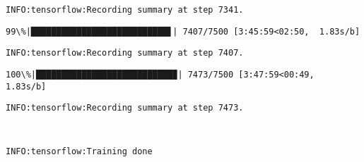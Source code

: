 \documentclass[11pt]{article}
\begin{document}
    \begin{Verbatim}[commandchars=\\\{\}]
INFO:tensorflow:Recording summary at step 7341.

    \end{Verbatim}

    \begin{Verbatim}[commandchars=\\\{\}]
 99\%|███████████████████████████▋| 7407/7500 [3:45:59<02:50,  1.83s/b]
    \end{Verbatim}

    \begin{Verbatim}[commandchars=\\\{\}]
INFO:tensorflow:Recording summary at step 7407.

    \end{Verbatim}

    \begin{Verbatim}[commandchars=\\\{\}]
100\%|███████████████████████████▉| 7473/7500 [3:47:59<00:49,  1.83s/b]
    \end{Verbatim}

    \begin{Verbatim}[commandchars=\\\{\}]
INFO:tensorflow:Recording summary at step 7473.

    \end{Verbatim}

    \begin{Verbatim}[commandchars=\\\{\}]
                                                                      
    \end{Verbatim}

    \begin{Verbatim}[commandchars=\\\{\}]
INFO:tensorflow:Training done

    \end{Verbatim}


    
    
    
    
\end{document}
